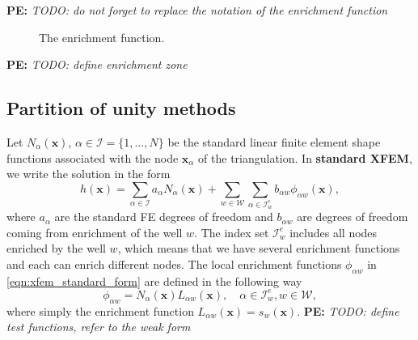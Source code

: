 \documentclass[preprint,12pt]{elsarticle}
\newcommand{\figpath}{../graphics/}
\def\vc#1{\mathbf{\boldsymbol{#1}}}     %
\newcommand{\bx}{\vc{x}}
\newcommand{\notePE}[1]{{\color{Orange} \textbf{PE: } \textit{#1}}}
\begin{document}
\notePE{TODO: do not forget to replace the notation of the enrichment function}
\begin{figure}[!htb]
  \begin{center}         
    \def\svgwidth{0.5\textwidth}
    
  \end{center}
  \caption{The enrichment function.}
  \label{fig:enrich_func}
\end{figure}

\notePE{TODO: define enrichment zone}
    
\subsection{Partition of unity methods}
Let $N_\alpha(\bx)$, $\alpha\in\mathcal{I}=\{1,\ldots,N\}$ be the standard linear finite element shape 
functions associated with the node $\bx_\alpha$ of the triangulation. 
In \textbf{standard XFEM}, we write the solution in the form
\begin{equation} \label{eqn:xfem_standard_form}
  h(\bx) = \sum \limits_{\alpha\in\mathcal{I}}a_\alpha N_\alpha(\bx)
    + \sum \limits_{w\in\mathcal{W}} \sum \limits_{\alpha\in\mathcal{I}^e_w} b_{\alpha w} \phi_{\alpha w}(\bx),
\end{equation}
where $a_\alpha$ are the standard FE degrees of freedom and $b_{\alpha w}$ are degrees of freedom coming from
enrichment of the well $w$. The index set $\mathcal{I}^e_w$ includes all nodes enriched by the well $w$, which
means that we have several enrichment functions and each can enrich different nodes.
The local enrichment functions $\phi_{\alpha w}$ in \eqref{eqn:xfem_standard_form} are defined
in the following way
\begin{equation} \label{eqn:xfem_enrich}
    \phi_{\alpha w} = N_\alpha(\bx)L_{\alpha w}(\bx), \quad \alpha\in\mathcal{I}^e_w, w\in\mathcal{W},
\end{equation}
where simply the enrichment function $L_{\alpha w}(\bx) = s_w(\bx)$.
\notePE{TODO: define test functions, refer to the weak form}
\end{document}
